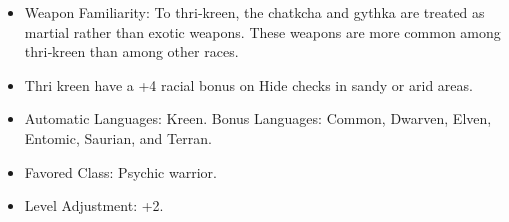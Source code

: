 \begin{itemize}
    \item Weapon Familiarity: To thri‐kreen, the chatkcha and gythka are treated as martial rather than exotic weapons. These weapons are more common among thri‐kreen than among other races.
    \item Thri kreen have a +4 racial bonus on Hide checks in sandy or arid areas.
    \item Automatic Languages: Kreen. Bonus Languages: Common, Dwarven, Elven, Entomic, Saurian, and Terran.
    \item Favored Class: Psychic warrior.
    \item Level Adjustment: +2.
\end{itemize}

